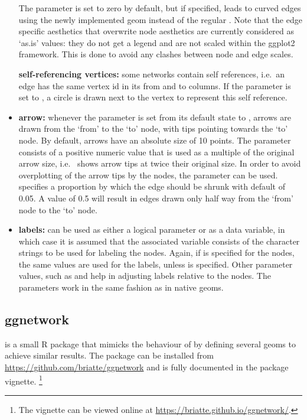 \begin{itemize}
The parameter  is set to zero by default, but if specified, leads to curved edges using the newly implemented  geom  instead of the regular .
Note that the edge specific aesthetics that overwrite node aesthetics are currently considered as `as.is' values: they do not get a legend and are not scaled within the ggplot2 framework. This is done to avoid any clashes between node and edge scales.

{\bf self-referencing vertices:} some networks contain self references, i.e.\  an edge has the same vertex id in its from and to columns. If the parameter  is set to , a circle is drawn next to the vertex to represent this self reference.

%
\item {\bf arrow:} whenever the parameter  is set from its default state to , arrows are drawn from the `from' to the `to' node, with tips pointing towards the `to' node.  By default, arrows have an absolute size of 10 points. The parameter  consists of a positive numeric value that is used as a multiple of the original arrow size, i.e.\  shows arrow tips at twice their original size. In order to avoid overplotting of the arrow tips by the nodes, the parameter  can be used.  specifies a proportion by which the edge should be shrunk with default of 0.05. A value of 0.5 will result in edges drawn only half way from the `from' node to the `to' node.
\item {\bf labels:}   can be used as either a logical parameter or as a data variable, in which case it is assumed that the associated variable consists of the character strings to be used for labeling the nodes. Again, if  is specified for the nodes, the same values are used for the labels, unless  is specified. Other parameter values, such as  and  help in adjusting labels relative to the nodes. The parameters work in the same fashion as in native  geoms.

\end{itemize}

\subsection{ggnetwork} %

 is a small R package that mimicks the behaviour of  by defining several geoms to achieve similar results. The package can be installed from \url{https://github.com/briatte/ggnetwork} and is fully documented in the package vignette.%
%
\footnote{The vignette can be viewed online at \url{https://briatte.github.io/ggnetwork/}.}%

